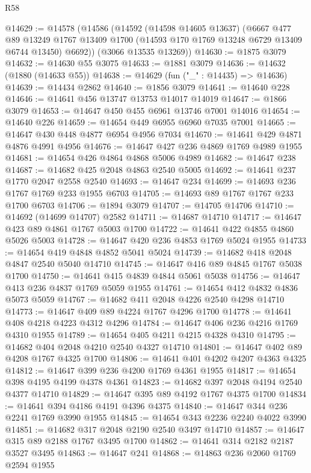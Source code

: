 \begin{lexlean}{R58}
\begin{coremodule}
@14629 := @14578
    (@14586
      (@14592
        (@14598 @14605 @13637)
        (@6667
          @477
          @89
          @13249
          @1767
          @13409
          @1700
          (@14593 @170 @1769 @13248 @6729 @13409 @6744 @13450)
          @6692))
      (@3066 @13535 @13269))
@14630 := @1875 @3079
@14632 := @14630 @55 @3075
@14633 := @1881 @3079
@14636 := @14632 (@1880 (@14633 @55))
@14638 := @14629 (fun ("_" : @14435) => @14636)
@14639 := @14434 @2862
@14640 := @1856 @3079
@14641 := @14640 @228
@14646 := @14641 @456 @13747 @13753 @14017 @14019
@14647 := @1866 @3079
@14653 := @14647 @450 @455 @6961 @13746 @7001 @14016
@14654 := @14640 @226
@14659 := @14654 @449 @6955 @6960 @7035 @7001
@14665 := @14647 @430 @448 @4877 @6954 @4956 @7034
@14670 := @14641 @429 @4871 @4876 @4991 @4956
@14676 := @14647 @427 @236 @4869 @1769 @4989 @1955
@14681 := @14654 @426 @4864 @4868 @5006 @4989
@14682 := @14647 @238
@14687 := @14682 @425 @2048 @4863 @2540 @5005
@14692 := @14641 @237 @1770 @2047 @2558 @2540
@14693 := @14647 @234
@14699 := @14693 @236 @1767 @1769 @233 @1955 @6703
@14705 := @14693 @89 @1767 @1767 @233 @1700 @6703
@14706 := @1894 @3079
@14707 := @14705 @14706
@14710 := @14692 (@14699 @14707) @2582
@14711 := @14687 @14710
@14717 := @14647 @423 @89 @4861 @1767 @5003 @1700
@14722 := @14641 @422 @4855 @4860 @5026 @5003
@14728 := @14647 @420 @236 @4853 @1769 @5024 @1955
@14733 := @14654 @419 @4848 @4852 @5041 @5024
@14739 := @14682 @418 @2048 @4847 @2540 @5040 @14710
@14745 := @14647 @416 @89 @4845 @1767 @5038 @1700
@14750 := @14641 @415 @4839 @4844 @5061 @5038
@14756 := @14647 @413 @236 @4837 @1769 @5059 @1955
@14761 := @14654 @412 @4832 @4836 @5073 @5059
@14767 := @14682 @411 @2048 @4226 @2540 @4298 @14710
@14773 := @14647 @409 @89 @4224 @1767 @4296 @1700
@14778 := @14641 @408 @4218 @4223 @4312 @4296
@14784 := @14647 @406 @236 @4216 @1769 @4310 @1955
@14789 := @14654 @405 @4211 @4215 @4328 @4310
@14795 := @14682 @404 @2048 @4210 @2540 @4327 @14710
@14801 := @14647 @402 @89 @4208 @1767 @4325 @1700
@14806 := @14641 @401 @4202 @4207 @4363 @4325
@14812 := @14647 @399 @236 @4200 @1769 @4361 @1955
@14817 := @14654 @398 @4195 @4199 @4378 @4361
@14823 := @14682 @397 @2048 @4194 @2540 @4377 @14710
@14829 := @14647 @395 @89 @4192 @1767 @4375 @1700
@14834 := @14641 @394 @4186 @4191 @4396 @4375
@14840 := @14647 @344 @236 @2241 @1769 @3990 @1955
@14845 := @14654 @343 @2236 @2240 @4022 @3990
@14851 := @14682 @317 @2048 @2190 @2540 @3497 @14710
@14857 := @14647 @315 @89 @2188 @1767 @3495 @1700
@14862 := @14641 @314 @2182 @2187 @3527 @3495
@14863 := @14647 @241
@14868 := @14863 @236 @2060 @1769 @2594 @1955

\end{coremodule}
\end{lexlean}

